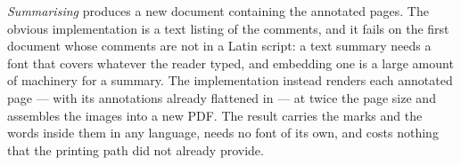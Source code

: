 \emph{Summarising} produces a new document containing the annotated pages. The obvious
implementation is a text listing of the comments, and it fails on the first document whose
comments are not in a Latin script: a text summary needs a font that covers whatever the
reader typed, and embedding one is a large amount of machinery for a summary. The
implementation instead renders each annotated page --- with its annotations already flattened
in --- at twice the page size and assembles the images into a new PDF. The result carries the
marks and the words inside them in any language, needs no font of its own, and costs nothing
that the printing path did not already provide.
